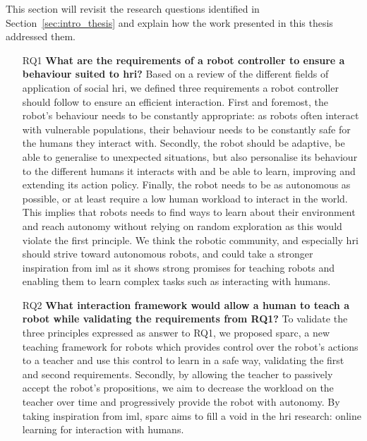 This section will revisit the research questions identified in Section~\ref{sec:intro_thesis} and explain how the work presented in this thesis addressed them.
\begin{itemize}
\item [RQ1] \textbf{What are the requirements of a robot controller to ensure a behaviour suited to \gls{hri}?} 
Based on a review of the different fields of application of social \gls{hri}, we defined three requirements a robot controller should follow to ensure an efficient interaction. First and foremost, the robot's behaviour needs to be constantly appropriate: as robots often interact with vulnerable populations, their behaviour needs to be constantly safe for the humans they interact with. Secondly, the robot should be adaptive, be able to generalise to unexpected situations, but also personalise its behaviour to the different humans it interacts with and be able to learn, improving and extending its action policy. Finally, the robot needs to be as autonomous as possible, or at least require a low human workload to interact in the world. This implies that robots needs to find ways to learn about their environment and reach autonomy without relying on random exploration as this would violate the first principle. We think the robotic community, and especially \gls{hri} should strive toward autonomous robots, and could take a stronger inspiration from \gls{iml} as it shows strong promises for teaching robots and enabling them to learn complex tasks such as interacting with humans.

\item [RQ2] \textbf{What interaction framework would allow a human to teach a robot while validating the requirements from RQ1?}
To validate the three principles expressed as answer to RQ1, we proposed \gls{sparc}, a new teaching framework for robots which provides control over the robot's actions to a teacher and use this control to learn in a safe way, validating the first and second requirements. Secondly, by allowing the teacher to passively accept the robot's propositions, we aim to decrease the workload on the teacher over time and progressively provide the robot with autonomy. By taking inspiration from \gls{iml}, \gls{sparc} aims to fill a void in the \gls{hri} research: online learning for interaction with humans.


\end{itemize}
